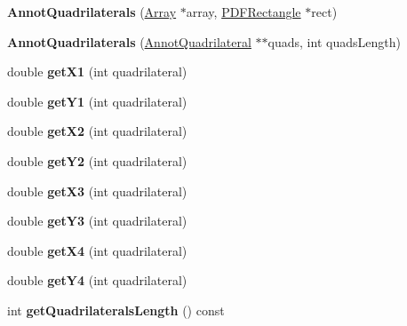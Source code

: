 \begin{DoxyCompactItemize}
\item 
\mbox{\label{class_annot_quadrilaterals_aea4009294107a322f0314fb63653ce05}} 
{\bfseries Annot\+Quadrilaterals} (\hyperlink{class_array}{Array} $\ast$array, \hyperlink{class_p_d_f_rectangle}{P\+D\+F\+Rectangle} $\ast$rect)
\item 
\mbox{\label{class_annot_quadrilaterals_a2ba3225928617c51490c3a459ff3ec79}} 
{\bfseries Annot\+Quadrilaterals} (\hyperlink{class_annot_quadrilaterals_1_1_annot_quadrilateral}{Annot\+Quadrilateral} $\ast$$\ast$quads, int quads\+Length)
\item 
\mbox{\label{class_annot_quadrilaterals_ae27d48998878266fa4391f1378533595}} 
double {\bfseries get\+X1} (int quadrilateral)
\item 
\mbox{\label{class_annot_quadrilaterals_a0f6adfa3dbd81b22155077c227cc678d}} 
double {\bfseries get\+Y1} (int quadrilateral)
\item 
\mbox{\label{class_annot_quadrilaterals_ad56f318f556c6c57ae34095fc4cc32ea}} 
double {\bfseries get\+X2} (int quadrilateral)
\item 
\mbox{\label{class_annot_quadrilaterals_aa465f38a0ea8cae1c8a82d887bf29dc6}} 
double {\bfseries get\+Y2} (int quadrilateral)
\item 
\mbox{\label{class_annot_quadrilaterals_a194da56e3eb8b2e705af254720e6212c}} 
double {\bfseries get\+X3} (int quadrilateral)
\item 
\mbox{\label{class_annot_quadrilaterals_a18b7a2ee6dd0eb601bb882363f9a1c5c}} 
double {\bfseries get\+Y3} (int quadrilateral)
\item 
\mbox{\label{class_annot_quadrilaterals_a4cf903ad9cf5a5339f8f52bf0b50f69e}} 
double {\bfseries get\+X4} (int quadrilateral)
\item 
\mbox{\label{class_annot_quadrilaterals_a9c8e64b27a61391e8d1a679e2c006a0a}} 
double {\bfseries get\+Y4} (int quadrilateral)
\item 
\mbox{\label{class_annot_quadrilaterals_a19b43f1f0bd9709be5a097aa9a881ed3}} 
int {\bfseries get\+Quadrilaterals\+Length} () const
\end{DoxyCompactItemize}
